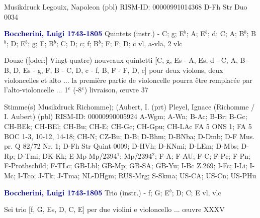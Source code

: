 \documentclass[twocolumn]{book}
\begin{document}
\newline Musikdruck
\newline Legouix, Napoleon  (pbl)
\newline RISM-ID: 00000991014368
\newline D-Fh  Str Duo 0034
\newline \par \vspace{7pt} \textcolor{darkblue}{\textbf{Boccherini, Luigi  1743-1805}}
\newline Quintets (instr.) - C; g; E$^b$; A; E$^b$; d; C; A; B$^b$; B$^b$; D; E$^b$; g; F; B$^b$; C; D; c; f; B$^b$; F; F; D; c
 vl, a-vla, 2 vlc
\newline \begin{itshape}Douze ([oder:] Vingt-quatre) nouveaux quintetti [C, g, Es - A, Es, d - C, A, B - B, D, Es - g, F, B - C, D, c - f, B, F - F, D, c] pour deux violons, deux violoncelles et alto ... la première partie de violoncelle pourra être remplacée par l'alto-violoncelle ... 1$^e$ (-8$^e$) livraison, œuvre 37\end{itshape} 
\newline \textcolor{darkblue}{}  Stimme(s)
\newline Musikdruck
\newline Richomme); (Aubert, I.  (prt)
\newline Pleyel, Ignace (Richomme / I. Aubert)  (pbl)
\newline RISM-ID: 00000990005924
\newline A-Wgm; A-Wn; B-Ac; B-Br; B-Gc; CH-BEk; CH-BEl; CH-Bu; CH-E; CH-Gc; CH-Gpu; CH-LAc  FA 5 ONS 1; FA 5 BOC 1-3, 10-12, 14-18; CH-N; CZ-Bu; D-B; D-Bhm; D-BNba; D-Dmb; D-F  Mus. pr. Q 82/72 Nr. 1; D-Fh  Str Quint 0009; D-HVh; D-KNmi; D-LEm; D-Mbs; D-Rp; D-Tmi; DK-Kk; E-Mp  Mp/2394$^1$; Mp/2394$^2$; F-A; F-AU; F-C; F-Pc; F-Pn; F-Prothschild; F-TLc; GB-Lbl; GB-Mp; GB-SA; GB-Yu; I-Bc  Z.269; I-Fc; I-Li; I-Mc; I-Tco; J-Tk; J-Tma; NL-DHgm; RUS-Mrg; S-Skma; US-CA; US-Cn; US-PHu
\newline \par \vspace{7pt} \textcolor{darkblue}{\textbf{Boccherini, Luigi  1743-1805}}
\newline Trio (instr.) - f; G; E$^b$; D; C; E
 vl, vlc
\newline \begin{itshape}Sei trio [f, G, Es, D, C, E] per due violini e violoncello ... œuvre XXXV\end{itshape} 
\end{document}

